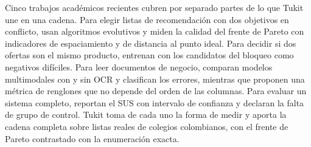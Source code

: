 Cinco trabajos académicos recientes cubren por separado partes de lo que Tukit une en una cadena.
Para elegir listas de recomendación con dos objetivos en conflicto, \citet{lotfian_himars_2026} usan
algoritmos evolutivos y miden la calidad del frente de Pareto con indicadores de espaciamiento y de
distancia al punto ideal. Para decidir si dos ofertas son el mismo producto, \citet{almagro_blocking_2022}
entrenan con los candidatos del bloqueo como negativos difíciles. Para leer documentos de negocio,
\citet{shen_ocr_2026} comparan modelos multimodales con y sin OCR y clasifican los errores, mientras que
\citet{cesista_retrieval_2024} proponen una métrica de renglones que no depende del orden de las
columnas. Para evaluar un sistema completo, \citet{kian_dart_2026} reportan el SUS con intervalo de
confianza y declaran la falta de grupo de control. Tukit toma de cada uno la forma de medir y aporta la
cadena completa sobre listas reales de colegios colombianos, con el frente de Pareto contrastado con la
enumeración exacta.

